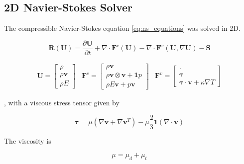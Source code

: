 \subsection{2D Navier-Stokes Solver}
\label{sec:2d_navier_stokes_solver}

The compressible Navier-Stokes equation \eqref{eq:ns_equations} was solved in 2D.

\begin{equation}
    \mathbf{R(\mathbf{U})} = \frac{\partial \mathbf{U}}{\partial t} + \nabla \cdot \mathbf{F}^c(\mathbf{U}) - \nabla \cdot \mathbf{F}^v(\mathbf{U}, \nabla \mathbf{U}) - \mathbf{S}
    \label{eq:navier-stokes}
\end{equation}


\begin{eqnarray}
   \mathbf{U} = \begin{bmatrix} \rho \\ \rho \mathbf{v} \\ \rho E \end{bmatrix} 
   & \mathbf{F}^c = \begin{bmatrix} \rho \mathbf{v}  \\ \rho \mathbf{v}\otimes \mathbf{v} + \mathbf{1} p \\ \rho E \mathbf{v} + p \mathbf{v} \end{bmatrix} 
   & \mathbf{F}^v = \begin{bmatrix} \cdot \\ \boldsymbol{\tau} \\ \boldsymbol{\tau} \cdot \mathbf{v} + \kappa \nabla T \end{bmatrix} 
   \label{eq:ns_equations}
\end{eqnarray}

, with a viscous stress tensor given by 

\begin{equation}
    \boldsymbol{\tau} = \mu \left( \nabla \mathbf{v} + \nabla \mathbf{v}^T \right) - \mu \frac{2}{3} \mathbf{1} \left( \nabla \cdot \mathbf{v} \right)
    \label{eq:ns_stress_tensor}
\end{equation}

The viscosity is

\begin{equation}
    \mu = \mu_d + \mu_t
    \label{eq:mu}
\end{equation}


